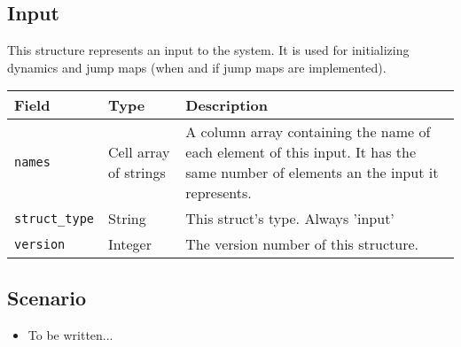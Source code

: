 \documentclass{article} %
\begin{document}
		\subsection{Input}
			This structure represents an input to the system. It is used for initializing dynamics and jump maps (when and if
			jump maps are implemented).

			\vspace{\baselineskip}

			\begin{tabular}{ p{} | p{} | p{}}
				Field                   & Type                               & Description                                            \\ \hline
				\lstinline|names|       & \raggedright Cell array of strings & A column array containing the name of each element of
				                                                               this input. It has the same number of elements an the
				                                                               input it represents.                                   \\[1ex]
				\lstinline|struct_type| & String                             & This struct's type. Always 'input'                     \\
				\lstinline|version|     & Integer                            & The version number of this structure.                  \\
			\end{tabular}

		\subsection{Scenario}
			\begin{itemize}
				\item To be written... %
			\end{itemize}
\end{document}
